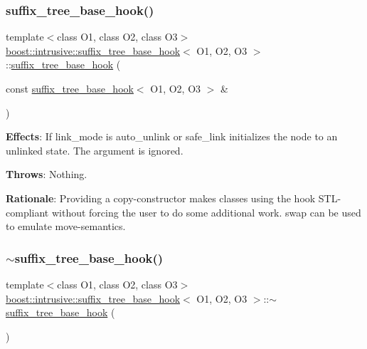 \subsubsection{\texorpdfstring{suffix\+\_\+tree\+\_\+base\+\_\+hook()}{suffix\_tree\_base\_hook()}\hspace{0.1cm}{\footnotesize\ttfamily [2/2]}}
{\footnotesize\ttfamily template$<$class O1, class O2, class O3$>$ \\
\hyperlink{classboost_1_1intrusive_1_1suffix__tree__base__hook}{boost\+::intrusive\+::suffix\+\_\+tree\+\_\+base\+\_\+hook}$<$ O1, O2, O3 $>$\+::\hyperlink{classboost_1_1intrusive_1_1suffix__tree__base__hook}{suffix\+\_\+tree\+\_\+base\+\_\+hook} (\begin{DoxyParamCaption}\item[{const \hyperlink{classboost_1_1intrusive_1_1suffix__tree__base__hook}{suffix\+\_\+tree\+\_\+base\+\_\+hook}$<$ O1, O2, O3 $>$ \&}]{ }\end{DoxyParamCaption})}

{\bfseries Effects}\+: If link\+\_\+mode is {\ttfamily auto\+\_\+unlink} or {\ttfamily safe\+\_\+link} initializes the node to an unlinked state. The argument is ignored.

{\bfseries Throws}\+: Nothing.

{\bfseries Rationale}\+: Providing a copy-\/constructor makes classes using the hook S\+T\+L-\/compliant without forcing the user to do some additional work. {\ttfamily swap} can be used to emulate move-\/semantics. \mbox{\label{classboost_1_1intrusive_1_1suffix__tree__base__hook_a5b93f2dd321b1ebf770e953bf884853d}} 
\subsubsection{\texorpdfstring{$\sim$suffix\+\_\+tree\+\_\+base\+\_\+hook()}{~suffix\_tree\_base\_hook()}}
{\footnotesize\ttfamily template$<$class O1, class O2, class O3$>$ \\
\hyperlink{classboost_1_1intrusive_1_1suffix__tree__base__hook}{boost\+::intrusive\+::suffix\+\_\+tree\+\_\+base\+\_\+hook}$<$ O1, O2, O3 $>$\+::$\sim$\hyperlink{classboost_1_1intrusive_1_1suffix__tree__base__hook}{suffix\+\_\+tree\+\_\+base\+\_\+hook} (\begin{DoxyParamCaption}{ }\end{DoxyParamCaption})}

